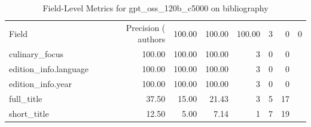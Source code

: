 \begin{table}
\caption{Field-Level Metrics for gpt_oss_120b_c5000 on bibliography}
\label{tab:fields_gpt_oss_120b_c5000_bibliography}
\begin{tabular}{lrrrrrr}
\toprule
Field & Precision (%
\midrule
authors & 100.00 & 100.00 & 100.00 & 3 & 0 & 0 \\
culinary_focus & 100.00 & 100.00 & 100.00 & 3 & 0 & 0 \\
edition_info.language & 100.00 & 100.00 & 100.00 & 3 & 0 & 0 \\
edition_info.year & 100.00 & 100.00 & 100.00 & 3 & 0 & 0 \\
full_title & 37.50 & 15.00 & 21.43 & 3 & 5 & 17 \\
short_title & 12.50 & 5.00 & 7.14 & 1 & 7 & 19 \\
\bottomrule
\end{tabular}
\end{table}
